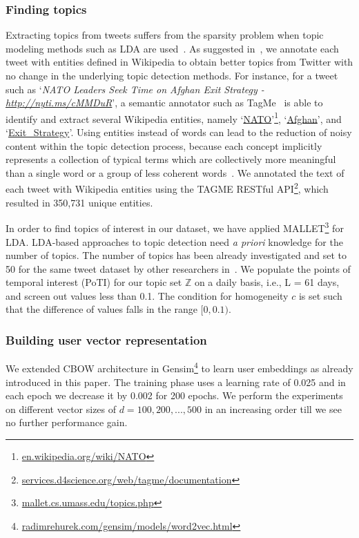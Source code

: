 \documentclass[sigconf]{acmart}
\begin{document}
\subsubsection{Finding topics}
Extracting topics from tweets suffers from the sparsity problem when topic modeling methods such as LDA are used~\cite{escri/ZarrinkalamB17}. As suggested in~\cite{DBLP:conf/ecir/ZarrinkalamFBK17, DBLP:conf/ecir/ZarrinkalamFBK16}, we annotate each tweet with entities defined in Wikipedia to obtain better topics from Twitter with no change in the underlying topic detection methods. For instance, for a tweet such as `\textit{NATO Leaders Seek Time on Afghan Exit Strategy - \href{http://nyti.ms/cMMDuR}{http://nyti.ms/cMMDuR}}', a semantic annotator such as TagMe~\cite{DBLP:conf/cikm/FerraginaS10} is able to identify and extract several Wikipedia entities, namely `\href{https://en.wikipedia.org/wiki/NATO}{NATO}'\footnote{\href{https://en.wikipedia.org/wiki/NATO}{en.wikipedia.org/wiki/NATO}}, `\href{https://en.wikipedia.org/wiki/Afghanistan}{Afghan}', and `\href{https://en.wikipedia.org/wiki/Exit_strategy}{Exit\_Strategy}'. Using entities instead of words can lead to the reduction of noisy content within the topic detection process, because each concept implicitly represents a collection of typical terms which are collectively more meaningful than a single word or a group of less coherent words~\cite{DBLP:conf/wims/PetkosPASK14}. We annotated the text of each tweet with Wikipedia entities using the TAGME RESTful API\footnote{\href{https://services.d4science.org/web/tagme/documentation}{services.d4science.org/web/tagme/documentation}}, which resulted in 350,731 unique entities. 

In order to find topics of interest in our dataset, we have applied MALLET\footnote{\href{http://mallet.cs.umass.edu/topics.php}{mallet.cs.umass.edu/topics.php}} for LDA. LDA-based approaches to topic detection need \textit{a priori} knowledge for the number of topics. The number of topics has been already investigated and set to 50 for the same tweet dataset by other researchers in~\cite{DBLP:journals/ci/FaniBZZD17}. We populate the points of temporal interest (PoTI) for our topic set $\mathbb{Z}$ on a daily basis, i.e., L = 61 days, and screen out values less than 0.1. The condition for homogeneity $c$ is set such that the difference of values falls in the range $[0, 0.1)$.

\subsubsection{Building user vector representation}
We extended CBOW architecture in Gensim\footnote{\href{https://radimrehurek.com/gensim/models/word2vec.html}{radimrehurek.com/gensim/models/word2vec.html}} to learn user embeddings as already introduced in this paper. The training phase uses a learning rate of 0.025 and in each epoch we decrease it by 0.002 for 200 epochs. We perform the experiments on different vector sizes of $d={100,200,...,500}$ in an increasing order till we see no further performance gain.
\end{document}
